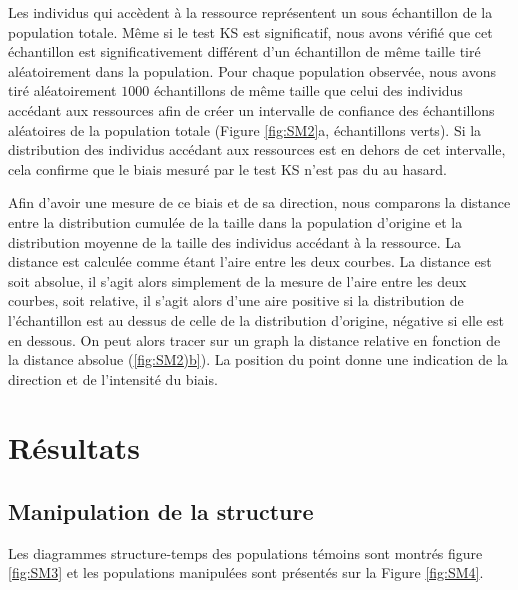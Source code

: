 Les individus qui accèdent à la ressource représentent un sous échantillon de la
population totale. Même si le test KS est significatif, nous avons vérifié que
cet échantillon est significativement différent d'un échantillon de même taille
tiré aléatoirement dans la population. Pour chaque population observée, nous
avons tiré aléatoirement $1000$ échantillons de même taille que celui des
individus accédant aux ressources afin de créer un intervalle de confiance des
échantillons aléatoires de la population totale (Figure \ref{fig:SM2}a,
échantillons verts). Si la distribution des individus accédant aux ressources
est en dehors de cet intervalle, cela confirme que le biais mesuré par le test KS
n'est pas du au hasard.

Afin d'avoir une mesure de ce biais et de sa direction, nous comparons la
distance entre la distribution cumulée de la taille dans la population d'origine
et la distribution moyenne de la taille des individus accédant à la ressource.
La distance est calculée comme étant l'aire entre les deux courbes. La distance
est soit absolue, il s'agit alors simplement de la mesure de l'aire entre les
deux courbes, soit relative, il s'agit alors d'une aire positive si la
distribution de l'échantillon est au dessus de celle de la distribution
d'origine, négative si elle est en dessous. On peut alors tracer sur un graph la
distance relative en fonction de la distance absolue (\ref{fig:SM2)b}). La
position du point donne une indication de la direction et de l'intensité du
biais.



\section{Résultats}

\subsection{Manipulation de la structure}

Les diagrammes structure-temps des populations témoins sont montrés figure
\ref{fig:SM3} et les populations manipulées sont présentés sur la Figure
\ref{fig:SM4}.

